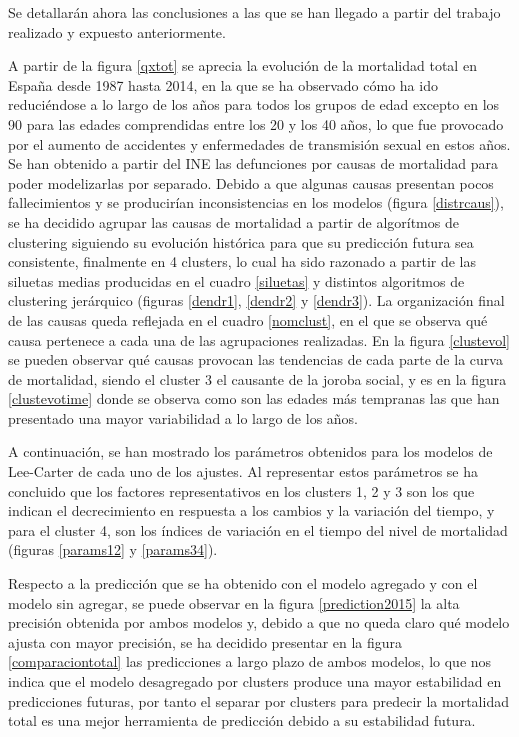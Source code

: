 \documentclass{article}
\begin{document}
Se detallarán ahora las conclusiones a las que se han llegado a partir del trabajo realizado y expuesto anteriormente.

\vspace{0.3cm}

A partir de la figura \ref{qxtot} se aprecia la evolución de la mortalidad total en España desde 1987 hasta 2014, en la que se ha observado cómo ha ido reduciéndose a lo largo de los años para todos los grupos de edad excepto en los 90 para las edades comprendidas entre los 20 y los 40 años, lo que fue provocado por el aumento de accidentes y enfermedades de transmisión sexual en estos años. Se han obtenido a partir del INE las defunciones por causas de mortalidad para poder modelizarlas por separado. Debido a que algunas causas presentan pocos fallecimientos y se producirían inconsistencias en los modelos (figura \ref{distrcaus}), se ha decidido agrupar las causas de mortalidad a partir de algorítmos de clustering siguiendo su evolución histórica para que su predicción futura sea consistente, finalmente en 4 clusters, lo cual ha sido razonado a partir de las siluetas medias producidas en el cuadro \ref{siluetas} y distintos algoritmos de clustering jerárquico (figuras \ref{dendr1}, \ref{dendr2} y \ref{dendr3}). La organización final de las causas queda reflejada en el cuadro \ref{nomclust}, en el que se observa qué causa pertenece a cada una de las agrupaciones realizadas. En la figura \ref{clustevol} se pueden observar qué causas provocan las tendencias de cada parte de la curva de mortalidad, siendo el cluster 3 el causante de la joroba social, y es en la figura \ref{clustevotime} donde se observa como son las edades más tempranas las que han presentado una mayor variabilidad a lo largo de los años.

\vspace{0.3cm}

A continuación, se han mostrado los parámetros obtenidos para los modelos de Lee-Carter de cada uno de los ajustes. Al representar estos parámetros se ha concluido que los factores representativos en los clusters 1, 2 y 3 son los que indican el decrecimiento en respuesta a los cambios y la variación del tiempo, y para el cluster 4, son los índices de variación en el tiempo del nivel de mortalidad (figuras \ref{params12} y \ref{params34}). 

\vspace{0.3cm}

Respecto a la predicción que se ha obtenido con el modelo agregado y con el modelo sin agregar, se puede observar en la figura \ref{prediction2015} la alta precisión obtenida por ambos modelos y, debido a que no queda claro qué modelo ajusta con mayor precisión, se ha decidido presentar en la figura \ref{comparaciontotal} las predicciones a largo plazo de ambos modelos, lo que nos indica que el modelo desagregado por clusters produce una mayor estabilidad en predicciones futuras, por tanto el separar por clusters para predecir la mortalidad total es una mejor herramienta de predicción debido a su estabilidad futura.
\end{document}
